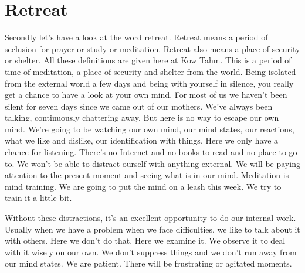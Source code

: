 \documentclass[letterpaper,10pt,english]{sphinxmanual}
\begin{document}
\section{Retreat}
\label{\detokenize{0-a:retreat}}
\sphinxAtStartPar
Secondly let’s have a look at the word retreat. Retreat means a period
of seclusion for prayer or study or meditation. Retreat also means a place of
security or shelter. All these definitions are given here at Kow Tahm. This is
a period of time of meditation, a place of security and shelter from the world.
Being isolated from the external world a few days and being with yourself in
silence, you really get a chance to have a look at your own mind. For most of
   us we haven’t been silent for seven days since we came out of our mothers.
We’ve always been talking, continuously chattering away. But here is no way
to escape our own mind. We’re going to be watching our own mind, our mind
states, our reactions, what we like and dislike, our identification with things.
Here we only have a chance for listening. There’s no Internet and no books to
read and no place to go to. We won’t be able to distract ourself with anything
external. We will be paying attention to the present moment and seeing what
is in our mind. Meditation is mind training. We are going to put the mind on
a leash this week. We try to train it a little bit.

\sphinxAtStartPar
Without these distractions, it’s an excellent opportunity to do our internal work. Usually when we have a problem when we face difficulties, we
like to talk about it with others. Here we don’t do that. Here we examine it.
We observe it to deal with it wisely on our own. We don’t suppress things
and we don’t run away from our mind states. We are patient. There will be
frustrating or agitated moments.
\end{document}
